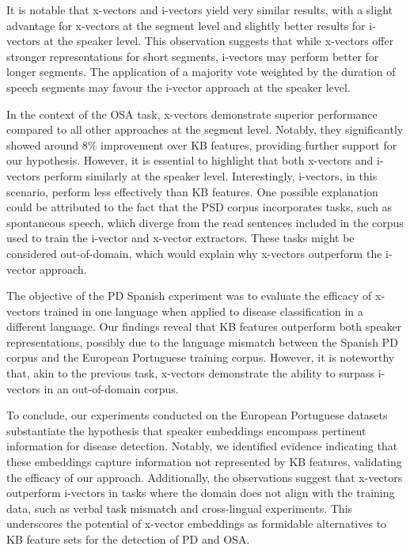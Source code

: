 It is notable that x-vectors and i-vectors yield very similar results, with a slight advantage for x-vectors at the segment level and slightly better results for i-vectors at the speaker level. This observation suggests that while x-vectors offer stronger representations for short segments, i-vectors may perform better for longer segments. The application of a majority vote weighted by the duration of speech segments may favour the i-vector approach at the speaker level.

In the context of the \ac{OSA} task, x-vectors demonstrate superior performance compared to all other approaches at the segment level. Notably, they significantly showed around 8\% improvement over \ac{KB} features, providing further support for our hypothesis. However, it is essential to highlight that both x-vectors and i-vectors perform similarly at the speaker level. Interestingly, i-vectors, in this scenario, perform less effectively than \ac{KB} features. One possible explanation could be attributed to the fact that the PSD corpus incorporates tasks, such as spontaneous speech, which diverge from the read sentences included in the corpus used to train the i-vector and x-vector extractors. These tasks might be considered out-of-domain, which would explain why x-vectors outperform the i-vector approach.

The objective of the \ac{PD} Spanish experiment was to evaluate the efficacy of x-vectors trained in one language when applied to disease classification in a different language. Our findings reveal that \ac{KB} features outperform both speaker representations, possibly due to the language mismatch between the Spanish \ac{PD} corpus and the European Portuguese training corpus. However, it is noteworthy that, akin to the previous task, x-vectors demonstrate the ability to surpass i-vectors in an out-of-domain corpus.

To conclude, our experiments conducted on the European Portuguese datasets substantiate the hypothesis that speaker embeddings encompass pertinent information for disease detection. Notably, we identified evidence indicating that these embeddings capture information not represented by \ac{KB} features, validating the efficacy of our approach. Additionally, the observations suggest that x-vectors outperform i-vectors in tasks where the domain does not align with the training data, such as verbal task mismatch and cross-lingual experiments. This underscores the potential of x-vector embeddings as formidable alternatives to \ac{KB} feature sets for the detection of \ac{PD} and \ac{OSA}.


